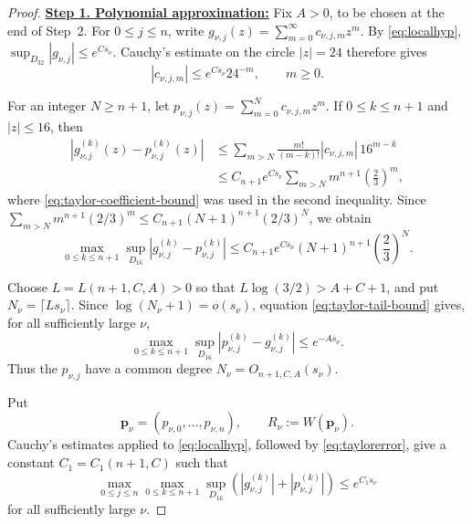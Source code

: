 \documentclass[12pt,letterpaper,reqno]{amsart}
\theoremstyle{definition}
\numberwithin{equation}{section}
\newcommand{\pv}{\bm p}
\begin{document}
\begin{proof}

\medskip\noindent
\textbf{\underline{Step 1. Polynomial approximation:}}
Fix \(A>0\), to be chosen at the end of Step~2. For
\(0\leq j\leq n\), write
\(g_{\nu,j}(z)=\sum_{m=0}^{\infty}c_{\nu,j,m}z^m\).
By \eqref{eq:localhyp},
\(\sup_{D_{32}}|g_{\nu,j}|\leq e^{Cs_\nu}\).
Cauchy's estimate on the circle \(|z|=24\) therefore gives
\begin{equation}\label{eq:taylor-coefficient-bound}
 |c_{\nu,j,m}|
 \leq
 e^{Cs_\nu}24^{-m},
 \qquad m\geq0.
\end{equation}

For an integer \(N\geq n+1\), let
\(p_{\nu,j}(z)=\sum_{m=0}^{N}c_{\nu,j,m}z^m\).
If \(0\leq k\leq n+1\) and \(|z|\leq16\), then
\[
\begin{aligned}
 |g_{\nu,j}^{(k)}(z)-p_{\nu,j}^{(k)}(z)|
 &\leq
 \sum_{m>N}
 \frac{m!}{(m-k)!}|c_{\nu,j,m}|\,16^{m-k}  \\
 &\leq
 C_{n+1} e^{Cs_\nu}
 \sum_{m>N}m^{n+1}\left(\frac23\right)^m,
\end{aligned}
\]
where \eqref{eq:taylor-coefficient-bound} was used in the second
inequality. Since
\(\sum_{m>N}m^{n+1}(2/3)^m
 \leq C_{n+1}(N+1)^{n+1}(2/3)^N\),
we obtain
\begin{equation}\label{eq:taylor-tail-bound}
 \max_{0\leq k\leq n+1}
 \sup_{D_{16}}
 |g_{\nu,j}^{(k)}-p_{\nu,j}^{(k)}|
 \leq
 C_{n+1} e^{Cs_\nu}(N+1)^{n+1}
 \left(\frac23\right)^N.
\end{equation}

Choose \(L=L({n+1},C,A)>0\) so that
\(L\log(3/2)>A+C+1\), and put
\(N_\nu=\lceil Ls_\nu\rceil\).
Since \(\log(N_\nu+1)=o(s_\nu)\), equation
\eqref{eq:taylor-tail-bound} gives, for all sufficiently large \(\nu\),
\begin{equation}\label{eq:taylorerror}
 \max_{0\leq k\leq n+1}
 \sup_{D_{16}}
 |p_{\nu,j}^{(k)}-g_{\nu,j}^{(k)}|
 \leq e^{-As_\nu}.
\end{equation}
Thus the \(p_{\nu,j}\) have a common degree
\(N_\nu=O_{n+1,C,A}(s_\nu)\).

Put
\[
 \pv_\nu=(p_{\nu,0},\ldots,p_{\nu,n}),
 \qquad
 R_\nu:=W(\pv_\nu).
\]
Cauchy's estimates applied to \eqref{eq:localhyp}, followed by
\eqref{eq:taylorerror}, give a constant \(C_1=C_1({n+1},C)\) such that
\begin{equation}\label{eq:derivative-growth}
 \max_{0\leq j\leq n}
 \max_{0\leq k\leq n+1}
 \sup_{D_{16}}
 \left(
 |g_{\nu,j}^{(k)}|
 +
 |p_{\nu,j}^{(k)}|
 \right)
 \leq e^{C_1s_\nu}
\end{equation}
for all sufficiently large \(\nu\).


\end{proof}
\end{document}
